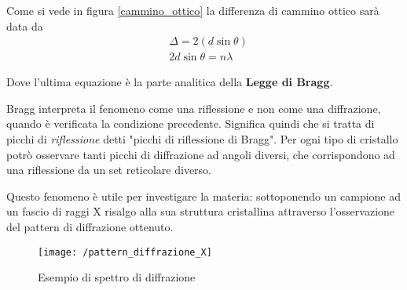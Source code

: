 Come si vede in figura \ref{cammino_ottico} la differenza di cammino ottico sarà data da
\begin{equation}
\begin{split}
& \Delta = 2 (d \sin\theta) \\ 
& 2 d \sin\theta = n \lambda 
\end{split}
\end{equation}

Dove l'ultima equazione è la parte analitica della \textbf{Legge di Bragg}.

Bragg interpreta il fenomeno come una riflessione e non come una diffrazione, quando è verificata la condizione precedente.
Significa quindi che si tratta di picchi di \textit{riflessione} detti "picchi di riflessione di Bragg".
Per ogni tipo di cristallo potrò osservare tanti picchi di diffrazione ad angoli diversi, che corrispondono ad una riflessione da un set reticolare diverso.

Questo fenomeno è utile per investigare la materia:
sottoponendo un campione ad un fascio di raggi X risalgo alla sua struttura cristallina attraverso l'osservazione del pattern di diffrazione ottenuto.

\begin{figure}[h]
\centering
\texttt{[image: /pattern\_diffrazione\_X]}
\caption{Esempio di spettro di diffrazione}
\end{figure}

